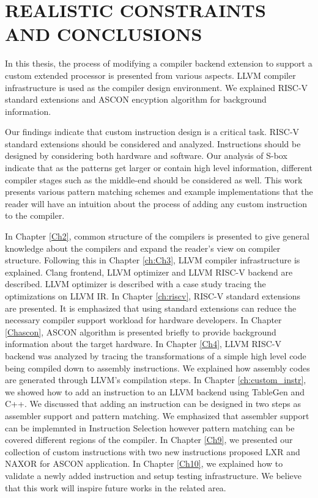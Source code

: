 \chapter{REALISTIC CONSTRAINTS AND CONCLUSIONS}\label{Ch6}

In this thesis, the process of modifying a compiler backend extension to support a custom extended processor is presented from various aspects. LLVM compiler infrastructure is used as the compiler design environment. We explained RISC-V standard extensions and ASCON encyption algorithm for background information. 

Our findings indicate that custom instruction design is a critical task. RISC-V standard extensions should be considered and analyzed. Instructions should be designed by considering both hardware and software. Our analysis of S-box indicate that as the patterns get larger or contain high level information, different compiler stages such as the middle-end should be considered as well. This work presents various pattern matching schemes and example implementations that the reader will have an intuition about the process of adding any custom instruction to the compiler. 

In Chapter \ref{Ch2}, common structure of the compilers is presented to give general knowledge about the compilers and expand the reader’s view on compiler structure. Following this in Chapter \ref{ch:Ch3}, LLVM compiler infrastructure is explained. Clang frontend, LLVM optimizer and LLVM RISC-V backend are described. LLVM optimizer is described with a case study tracing the optimizations on LLVM IR. In Chapter \ref{ch:riscv}, RISC-V standard extensions are presented. It is emphasized that using standard extensions can reduce the necessary compiler support workload for hardware developers. In Chapter \ref{Chascon}, ASCON algorithm is presented briefly to provide background information about the target hardware. In Chapter \ref{Ch4}, LLVM RISC-V backend was analyzed by tracing the transformations of a simple high level code being compiled down to assembly instructions. We explained how assembly codes are generated through LLVM’s compilation steps. In Chapter \ref{ch:custom_instr}, we showed how to add an instruction to an LLVM backend using TableGen and C++. We discussed that adding an instruction can be designed in two steps as assembler support and pattern matching. We emphasized that assembler support can be implemnted in Instruction Selection however pattern matching can be covered different regions of the compiler. In Chapter \ref{Ch9}, we presented our collection of custom instructions with two new instructions proposed LXR and NAXOR for ASCON application. In Chapter \ref{Ch10}, we explained how to validate a newly added instruction and setup testing infrastructure. We believe that this work will inspire future works in the related area.
